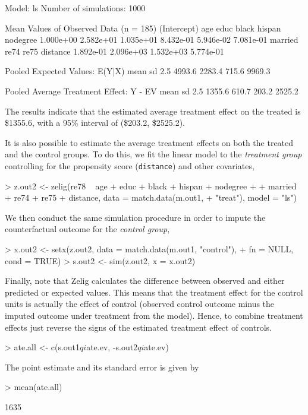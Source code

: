 \begin{enumerate}
\begin{Schunk}
\begin{Soutput}
  Model: ls 
  Number of simulations: 1000 

Mean Values of Observed Data (n = 185) 
(Intercept)         age        educ       black      hispan    nodegree 
  1.000e+00   2.582e+01   1.035e+01   8.432e-01   5.946e-02   7.081e-01 
    married        re74        re75    distance 
  1.892e-01   2.096e+03   1.532e+03   5.774e-01 

Pooled Expected Values: E(Y|X)
  mean     sd   2.5%  97.5% 
4993.6 2283.4  715.6 9969.3 

Pooled Average Treatment Effect: Y - EV
  mean     sd   2.5%  97.5% 
1355.6  610.7  203.2 2525.2 

\end{Soutput}
\end{Schunk}
The results indicate that the estimated average treatment effect on
the treated is 
\$1355.6,
with a 95\% interval of
(\$203.2,
\$2525.2).

It is also possible to estimate the average treatment effects on both
the treated and the control groups. To do this, we fit the linear
model to the {\it treatment group} controlling for the propensity
score ({\tt distance}) and other covariates,
\begin{Schunk}
\begin{Sinput}
> z.out2 <- zelig(re78 ~ age + educ + black + hispan + nodegree + 
+     married + re74 + re75 + distance, data = match.data(m.out1, 
+     "treat"), model = "ls")
\end{Sinput}
\end{Schunk}
We then conduct the same simulation procedure in order to impute the
counterfactual outcome for the {\it control group},
\begin{Schunk}
\begin{Sinput}
> x.out2 <- setx(z.out2, data = match.data(m.out1, "control"), 
+     fn = NULL, cond = TRUE)
> s.out2 <- sim(z.out2, x = x.out2)
\end{Sinput}
\end{Schunk}
Finally, note that Zelig calculates the difference between observed
and either predicted or expected values.  This means that the
treatment effect for the control units is actually the effect of
control (observed control outcome minus the imputed outcome under
treatment from the model).  Hence, to combine treatment effects just
reverse the signs of the estimated treatment effect of controls.
\begin{Schunk}
\begin{Sinput}
> ate.all <- c(s.out1$qi$ate.ev, -s.out2$qi$ate.ev)
\end{Sinput}
\end{Schunk}
The point estimate and its standard error is given by
\begin{Schunk}
\begin{Sinput}
> mean(ate.all)
\end{Sinput}
\begin{Soutput}
[1] 1635


\end{Soutput}
\end{Schunk}
\end{enumerate}
